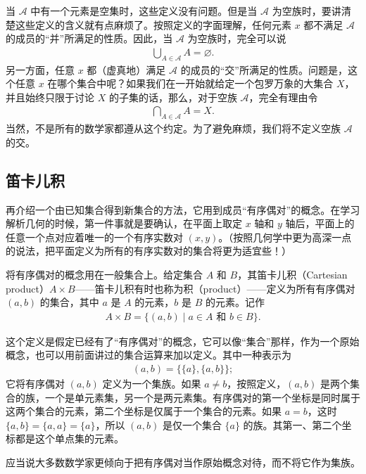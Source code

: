 \documentclass[../../main.tex]{subfiles}
\begin{document}
当 $\mathcal{A}$ 中有一个元素是空集时，这些定义没有问题。但是当 $\mathcal{A}$ 为空族时，要讲清楚这些定义的含义就有点麻烦了。按照定义的字面理解，任何元素 $x$ 都不满足 $\mathcal{A}$ 的成员的“并”所满足的性质。因此，当 $\mathcal{A}$ 为空族时，完全可以说
\begin{align*}
\bigcup_{A \in \mathcal{A}} A = \varnothing.
\end{align*}
另一方面，任意 $x$ 都（虚真地）满足 $\mathcal{A}$ 的成员的“交”所满足的性质。问题是，这个任意 $x$ 在哪个集合中呢？如果我们在一开始就给定一个包罗万象的大集合 $X$，并且始终只限于讨论 $X$ 的子集的话，那么，对于空族 $\mathcal{A}$，完全有理由令
\begin{align*}
\bigcap_{A \in \mathcal{A}} A = X.
\end{align*}
当然，不是所有的数学家都遵从这个约定。为了避免麻烦，我们将不定义空族 $\mathcal{A}$ 的交。

\subsection*{笛卡儿积}

再介绍一个由已知集合得到新集合的方法，它用到成员“有序偶对”的概念。在学习解析几何的时候，第一件事就是要确认，在平面上取定 $x$ 轴和 $y$ 轴后，平面上的任意一个点对应着唯一的一个有序实数对 $(x, y)$。（按照几何学中更为高深一点的说法，把平面定义为所有的有序实数对的集合将更为适宜些！）

将有序偶对的概念用在一般集合上。给定集合 $A$ 和 $B$，其笛卡儿积（Cartesian product）$A \times B$——笛卡儿积有时也称为积（product）——定义为所有有序偶对 $(a, b)$ 的集合，其中 $a$ 是 $A$ 的元素，$b$ 是 $B$ 的元素。记作
\begin{align}
A \times B = \{(a, b) \mid a \in A \text{ 和 } b \in B\}.\label{align:ch01-笛卡儿积}
\end{align}

这个定义是假定已经有了“有序偶对”的概念，它可以像“集合”那样，作为一个原始概念，也可以用前面讲过的集合运算来加以定义。其中一种表示为
\begin{align*}
(a, b) = \{\{a\}, \{a, b\}\};
\end{align*}
它将有序偶对 $(a, b)$ 定义为一个集族。如果 $a \neq b$，按照定义，$(a, b)$ 是两个集合的族，一个是单元素集，另一个是两元素集。有序偶对的第一个坐标是同时属于这两个集合的元素，第二个坐标是仅属于一个集合的元素。如果 $a = b$，这时 $\{a, b\} = \{a, a\} = \{a\}$，所以 $(a, b)$ 是仅一个集合 $\{a\}$ 的族。其第一、第二个坐标都是这个单点集的元素。

应当说大多数数学家更倾向于把有序偶对当作原始概念对待，而不将它作为集族。
\end{document}
